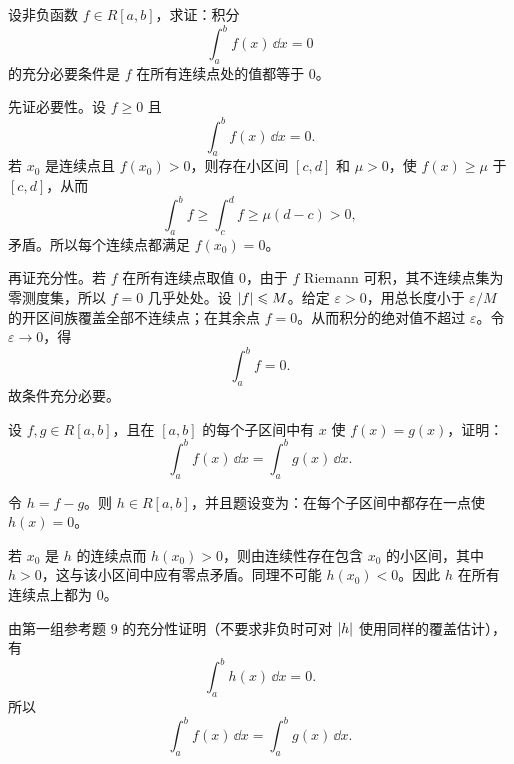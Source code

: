 \begin{xreferenceproblem}[9]
设非负函数 $f\in R[a,b]$，求证：积分
\[
  \int_a^b f(x)\,\dd x=0
\]
的充分必要条件是 $f$ 在所有连续点处的值都等于 0。
\end{xreferenceproblem}
\begin{xsolution}
先证必要性。设 $f\geqslant0$ 且
\[
  \int_a^b f(x)\,\dd x=0.
\]
若 $x_0$ 是连续点且 $f(x_0)>0$，则存在小区间 $[c,d]$ 和 $\mu>0$，使 $f(x)\geqslant\mu$ 于 $[c,d]$，从而
\[
  \int_a^b f\geqslant\int_c^d f\geqslant\mu(d-c)>0,
\]
矛盾。所以每个连续点都满足 $f(x_0)=0$。

再证充分性。若 $f$ 在所有连续点取值 $0$，由于 $f$ Riemann 可积，其不连续点集为零测度集，所以 $f=0$ 几乎处处。设 $\lvert f\rvert\leqslant M$。给定 $\varepsilon>0$，用总长度小于 $\varepsilon/M$ 的开区间族覆盖全部不连续点；在其余点 $f=0$。从而积分的绝对值不超过 $\varepsilon$。令 $\varepsilon\to0$，得
\[
  \int_a^b f=0.
\]
故条件充分必要。
\end{xsolution}


\begin{xreferenceproblem}[10]
设 $f,g\in R[a,b]$，且在 $[a,b]$ 的每个子区间中有 $x$ 使 $f(x)=g(x)$，证明：
\[
  \int_a^b f(x)\,\dd x=\int_a^b g(x)\,\dd x.
\]
\end{xreferenceproblem}
\begin{xsolution}
令 $h=f-g$。则 $h\in R[a,b]$，并且题设变为：在每个子区间中都存在一点使 $h(x)=0$。

若 $x_0$ 是 $h$ 的连续点而 $h(x_0)>0$，则由连续性存在包含 $x_0$ 的小区间，其中 $h>0$，这与该小区间中应有零点矛盾。同理不可能 $h(x_0)<0$。因此 $h$ 在所有连续点上都为 $0$。

由第一组参考题 9 的充分性证明（不要求非负时可对 $\lvert h\rvert$ 使用同样的覆盖估计），有
\[
  \int_a^b h(x)\,\dd x=0.
\]
所以
\[
  \boxed{\int_a^b f(x)\,\dd x=\int_a^b g(x)\,\dd x}.
\]
\end{xsolution}


